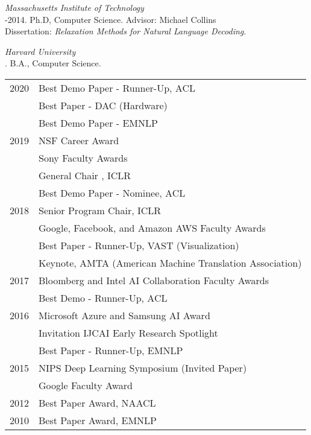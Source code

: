 \documentclass[10pt]{article}
\begin{document}
\noindent\emph{Massachusetts Institute of Technology \vspace{0.01in}}\\
-2014.  Ph.D, Computer Science. Advisor: Michael Collins\\
\ind Dissertation: \emph{Relaxation Methods for Natural Language Decoding}. %



\medskip
\noindent\emph{Harvard University\vspace{0.02in}}\\
. B.A., Computer Science.

\bigskip



\hspace{-1cm} \begin{tabular}{lp{11.5cm}}
2020 & Best Demo Paper - Runner-Up, ACL   \\
& Best Paper - DAC (Hardware)  \\
& Best Demo Paper - EMNLP  \\
2019 & NSF Career Award \\
& Sony Faculty Awards \\
     & General Chair , ICLR \\
& Best Demo Paper - Nominee, ACL   \\
2018 & Senior Program Chair, ICLR  \\
& Google, Facebook, and Amazon AWS Faculty Awards \\
& Best Paper - Runner-Up, VAST (Visualization)  \\
& Keynote, AMTA (American Machine Translation Association) \\
2017 & Bloomberg and Intel AI Collaboration Faculty Awards \\
& Best Demo  - Runner-Up, ACL  \\
2016 & Microsoft Azure  and Samsung AI Award \\
 & Invitation IJCAI Early Research Spotlight \\
& Best Paper - Runner-Up, EMNLP \\
2015 & NIPS Deep Learning Symposium (Invited Paper)   \\
 & Google Faculty Award \\
2012 & Best Paper Award, NAACL \\
2010 & Best Paper Award, EMNLP \\
\end{tabular}
\pagebreak
\bigskip
\end{document}
